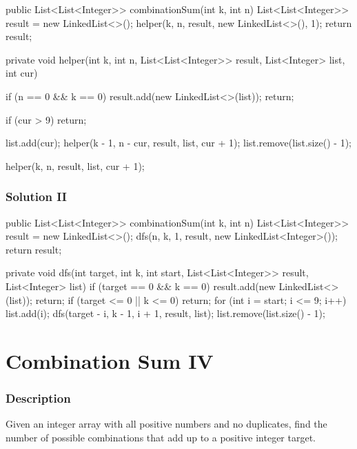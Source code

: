 \begin{Code}
public List<List<Integer>> combinationSum(int k, int n) {
    List<List<Integer>> result = new LinkedList<>();
    helper(k, n, result, new LinkedList<>(), 1);
    return result;
}

private void helper(int k, int n, List<List<Integer>> result, List<Integer> list, int cur) {
    if (n == 0 && k == 0) {
        result.add(new LinkedList<>(list));
        return;
    }

    if (cur > 9) {
        return;
    }

    list.add(cur);
    helper(k - 1, n - cur, result, list, cur + 1);
    list.remove(list.size() - 1);

    helper(k, n, result, list, cur + 1);
}
\end{Code}

\newpage

\subsubsection{Solution II}

\begin{Code}
public List<List<Integer>> combinationSum(int k, int n) {
    List<List<Integer>> result = new LinkedList<>();
    dfs(n, k, 1, result, new LinkedList<Integer>());
    return result;
}

private void dfs(int target, int k, int start, List<List<Integer>> result, List<Integer> list) {
    if (target == 0 && k == 0) {
        result.add(new LinkedList<>(list));
        return;
    }
    if (target <= 0 || k <= 0) {
        return;
    }
    for (int i = start; i <= 9; i++) {
        list.add(i);
        dfs(target - i, k - 1, i + 1, result, list);
        list.remove(list.size() - 1);
    }
}
\end{Code}

\newpage

\section{Combination Sum IV} %

\subsubsection{Description}
Given an integer array with all positive numbers and no duplicates, find the number of possible combinations that add up to a positive integer target.

